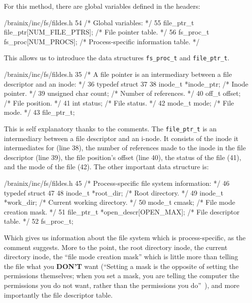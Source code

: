 For this method, there are global variables defined in the headers:
\begin{code}{/brainix/inc/fs/fildes.h}
54 /* Global variables: */
55 file_ptr_t file_ptr[NUM_FILE_PTRS]; /* File pointer table.                 */
56 fs_proc_t fs_proc[NUM_PROCS];       /* Process-specific information table. */
\end{code}
This allows us to introduce the data structures \verb|fs_proc_t| and \verb|file_ptr_t|. 
\begin{code}{/brainix/inc/fs/fildes.h}
35 /* A file pointer is an intermediary between a file descriptor and an inode: */
36 typedef struct
37 {
38      inode_t *inode_ptr;  /* Inode pointer.        */
39      unsigned char count; /* Number of references. */
40      off_t offset;        /* File position.        */
41      int status;          /* File status.          */
42      mode_t mode;         /* File mode.            */
43 } file_ptr_t;
\end{code}
This is self explanatory thanks to the comments. The \verb|file_ptr_t| is an intermediary between a file descriptor and an i-node. It consists of the inode it intermediates for (line 38), the number of references made to the inode in the file descriptor (line 39), the file position's offset (line 40), the status of the file (41), and the mode of the file (42). The other important data structure is:\marginpar[fs\_proc\_t]{}
\begin{code}{/brainix/inc/fs/fildes.h}
45 /* Process-specific file system information: */
46 typedef struct
47 {
48      inode_t *root_dir;                /* Root directory.            */
49      inode_t *work_dir;                /* Current working directory. */
50      mode_t cmask;                     /* File mode creation mask.   */
51      file_ptr_t *open_descr[OPEN_MAX]; /* File descriptor table.     */
52 } fs_proc_t;
\end{code}
Which gives us information about the file system which is process-specific, as the comment suggests. More to the point, the root directory inode, the current directory inode, the ``file mode creation mask'' which is little more than telling the file what you \textbf{DON'T} want (``Setting a mask is the opposite of setting the permissions themselves; when you set a mask, you are telling the computer the permissions you do not want, rather than the permissions you do''~\cite{9}), and more importantly the file descriptor table.

